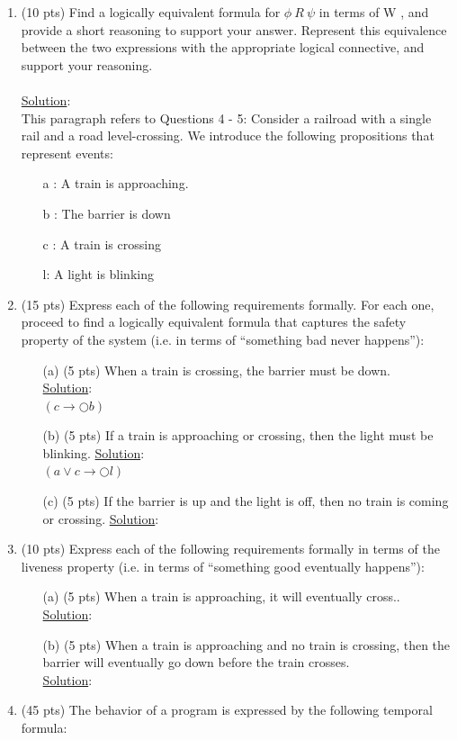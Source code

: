 \documentclass[12pt]{article}
\begin{document}
\begin{enumerate}
\item (10 pts) Find a logically equivalent formula for $\phi \ R \ \psi$ in terms of W , and provide a short reasoning
to support your answer. Represent this equivalence between the two expressions with the appropriate logical connective, and support your reasoning.\\\
\\
\noindent \underline{Solution}:\\
\noindent This paragraph refers to Questions 4 - 5: Consider a railroad with a single rail and a
road level-crossing. We introduce the following propositions that represent events:
\begin{itemize}
\item[] a : A train is approaching.
\item[] b : The barrier is down
\item[] c : A train is crossing
\item[] l: A light is blinking
\end{itemize}
\item (15 pts) Express each of the following requirements formally. For each one, proceed to
find a logically equivalent formula that captures the safety property of the system (i.e.
in terms of “something bad never happens”):
\begin{itemize}
\item[(a)] (5 pts) When a train is crossing, the barrier must be down. \\
\noindent \underline{Solution}:\\ 
\square $(c \rightarrow \bigcirc b)$
\item[(b)] (5 pts) If a train is approaching or crossing, then the light must be blinking.
\noindent \underline{Solution}:\\
\square $(a \vee c \rightarrow \bigcirc l)$
\item[(c)] (5 pts) If the barrier is up and the light is off, then no train is coming or crossing.
\noindent \underline{Solution}:\\
\end{itemize}
\item (10 pts) Express each of the following requirements formally in terms of the liveness
property (i.e. in terms of “something good eventually happens”):
\begin{itemize}
\item[(a)] (5 pts) When a train is approaching, it will eventually cross.. \\
\noindent \underline{Solution}:\\
\item[(b)] (5 pts) When a train is approaching and no train is crossing, then the barrier will
eventually go down before the train crosses. \\
\noindent \underline{Solution}:\\
\end{itemize}
\item (45 pts) The behavior of a program is expressed by the following temporal formula:\\


\end{enumerate}
\end{document}
